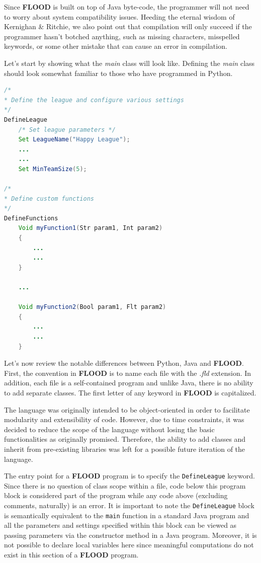\documentclass[12pt]{report}
\begin{document}
Since \textbf{FLOOD} is built on top of Java byte-code, the programmer will not need to worry about system compatibility issues. Heeding the eternal wisdom of Kernighan \& Ritchie, we also point out that compilation will only succeed if the programmer hasn't botched anything, such as missing characters, misspelled keywords, or some other mistake that can cause an error in compilation. 

Let's start by showing what the \textit{main} class will look like. Defining the \textit{main} class should look somewhat familiar to those who have programmed in Python.

\begin{singlespace}
\begin{lstlisting}[language=Java,label=some-code,caption={Sample.fld}]
/*
* Define the league and configure various settings
*/
DefineLeague
	/* Set league parameters */
	Set LeagueName("Happy League");
	...
	...
	Set MinTeamSize(5);

/*
* Define custom functions
*/
DefineFunctions
	Void myFunction1(Str param1, Int param2)
	{
		...
		...
	}

	...

	Void myFunction2(Bool param1, Flt param2)
	{
		...
		...
	}
\end{lstlisting}
\end{singlespace}

Let's now review the notable differences between Python, Java and \textbf{FLOOD}. First,  the convention in \textbf{FLOOD} is to name each file with the \textit{.fld} extension. In addition, each file is a self-contained program and unlike Java, there is no ability to add separate classes. The first letter of any keyword in \textbf{FLOOD} is capitalized.

The language was originally intended to be object-oriented in order to facilitate modularity and extensibility of code. However, due to time constraints, it was decided to reduce the scope of the language without losing the basic functionalities as originally promised. Therefore, the ability to add classes and inherit from pre-existing libraries was left for a possible future iteration of the language. 

The entry point for a \textbf{FLOOD} program is to specify the \texttt{DefineLeague} keyword. Since there is no question of class scope within a file, code below this program block is considered part of the program while any code above (excluding comments, naturally) is an error. It is important to note the \texttt{DefineLeague} block is semantically equivalent to the \texttt{main} function in a standard Java program and all the parameters and settings specified within this block can be viewed as passing parameters via the constructor method in a Java program. Moreover, it is not possible to declare local variables here since meaningful computations do not exist in this section of a \textbf{FLOOD} program. 
\end{document}
